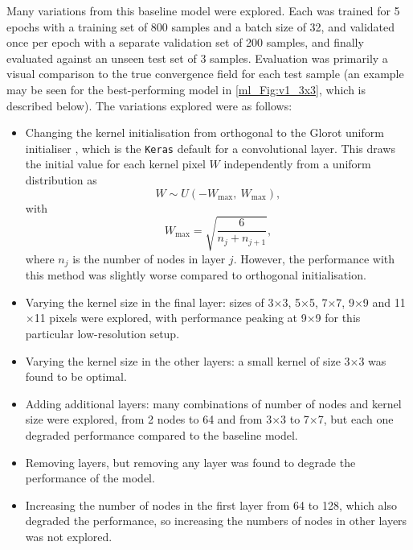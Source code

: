 Many variations from this baseline model were explored. Each was trained for 5 epochs with a training set of 800 samples and a batch size of 32, and validated once per epoch with a separate validation set of 200 samples, and finally evaluated against an unseen test set of 3 samples. Evaluation was primarily a visual comparison to the true convergence field for each test sample (an example may be seen for the best-performing model in \autoref{ml_Fig:v1_3x3}, which is described below). The variations explored were as follows:
\begin{itemize}
\item Changing the kernel initialisation from orthogonal to the Glorot uniform initialiser \citep{Glorot2010}, which is the \texttt{Keras} default for a convolutional layer. This draws the initial value for each kernel pixel $W$ independently from a uniform distribution as
\begin{equation}
W \sim U \left( - W_\text{max},~ W_\text{max} \right),
\end{equation}
with
\begin{equation}
W_\text{max} = \sqrt{\frac{6}{n_j + n_{j + 1}}},
\end{equation}
where $n_j$ is the number of nodes in layer $j$. However, the performance with this method was slightly worse compared to orthogonal initialisation.
\item Varying the kernel size in the final layer: sizes of 3$\times$3, 5$\times$5, 7$\times$7, 9$\times$9 and 11$\times$11 pixels were explored, with performance peaking at 9$\times$9 for this particular low-resolution setup.
\item Varying the kernel size in the other layers: a small kernel of size 3$\times$3 was found to be optimal.
\item Adding additional layers: many combinations of number of nodes and kernel size were explored, from 2 nodes to 64 and from 3$\times$3 to 7$\times$7, but each one degraded performance compared to the baseline model.
\item Removing layers, but removing any layer was found to degrade the performance of the model.
\item Increasing the number of nodes in the first layer from 64 to 128, which also degraded the performance, so increasing the numbers of nodes in other layers was not explored.
\end{itemize}

